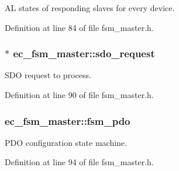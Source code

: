 \-A\-L states of responding slaves for every device. 



\-Definition at line 84 of file fsm\-\_\-master.\-h.

\subsubsection[{sdo\-\_\-request}]{$\ast$ {\bf ec\-\_\-fsm\-\_\-master\-::sdo\-\_\-request}}\label{structec__fsm__master_a4d4e15f7b94cd12a63a7450db070840b}


\-S\-D\-O request to process. 



\-Definition at line 90 of file fsm\-\_\-master.\-h.

\subsubsection[{fsm\-\_\-pdo}]{ {\bf ec\-\_\-fsm\-\_\-master\-::fsm\-\_\-pdo}}\label{structec__fsm__master_a93359faa0215a9448d5663a09f319372}


\-P\-D\-O configuration state machine. 



\-Definition at line 94 of file fsm\-\_\-master.\-h.

